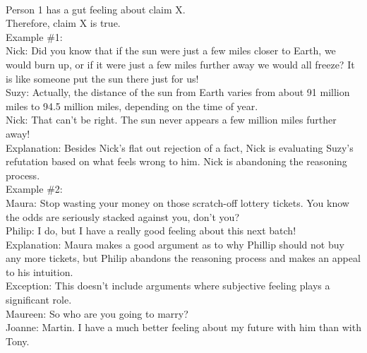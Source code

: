 \documentclass[a4paper,12pt,single,pdftex]{scrbook}
\begin{document}
    \\

    
      Person 1 has a gut feeling about claim X.
    \\

    
      Therefore, claim X is true.
    \\

    
      Example \#1:
    \\

    
      Nick: Did you know that if the sun were just a few miles closer to Earth, we would burn up, or if it were just a few miles further away we would all freeze? It is like someone put the sun there just for us!
    \\

    
      Suzy: Actually, the distance of the sun from Earth varies from about 91 million miles to 94.5 million miles, depending on the time of year.
    \\

    
      Nick: That can't be right. The sun never appears a few million miles further away!
    \\

    
      Explanation: Besides Nick's flat out rejection of a fact, Nick is evaluating Suzy's refutation based on what feels wrong to him. Nick is abandoning the reasoning process.
    \\

    
      Example \#2:
    \\

    
      Maura: Stop wasting your money on those scratch-off lottery tickets. You know the odds are seriously stacked against you, don't you?
    \\

    
      Philip: I do, but I have a really good feeling about this next batch!
    \\

    
      Explanation: Maura makes a good argument as to why Phillip should not buy any more tickets, but Philip abandons the reasoning process and makes an appeal to his intuition.
    \\

    
      Exception: This doesn't include arguments where subjective feeling plays a significant role.
    \\

    
      Maureen: So who are you going to marry?
    \\

    
      Joanne: Martin. I have a much better feeling about my future with him than with Tony.
    \\
\end{document}
